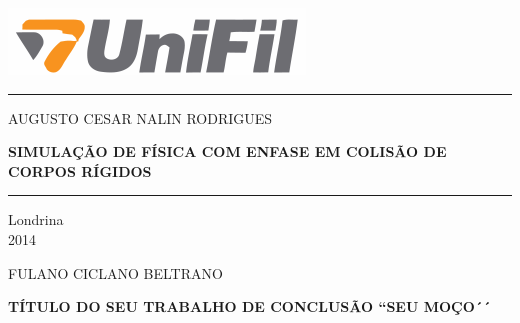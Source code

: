 ﻿%


\thispagestyle{empty}
\vspace*{-20mm}
\begin{center}      %
\includegraphics[scale=1.200]{LOGO/0_0_logo}
\end{center}        %
{\color{UNIFILSymbol}
\vspace{-6mm}
\noindent\rule[-1ex]{\textwidth}{5pt}}

\vspace{3mm}

\begin{center}
{\large  AUGUSTO CESAR NALIN RODRIGUES}
\end{center}

\vspace{42mm}


\begin{center}

\textbf{\large SIMULAÇÃO DE FÍSICA COM ENFASE EM COLISÃO DE CORPOS RÍGIDOS}

\end{center}


\vspace{119mm}

{\color{UNIFILSymbol}
\noindent\rule[-1ex]{\textwidth}{5pt}}

\vspace{0mm}

\begin{singlespace}
\begin{center}
Londrina\\
2014
\end{center}
\end{singlespace}

\newpage




\thispagestyle{empty}
\setcounter{page}{1}
\begin{center}
{\large  FULANO CICLANO BELTRANO}

\vspace{9.3cm}

\textbf{\large TÍTULO DO SEU TRABALHO DE CONCLUSÃO ``SEU MOÇO´´}

\end{center}

